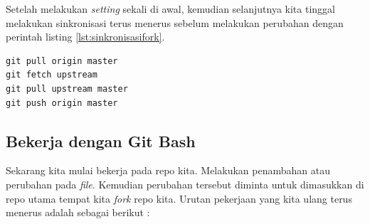 Setelah melakukan \textit{setting} sekali di awal, kemudian selanjutnya kita tinggal melakukan sinkronisasi terus menerus sebelum melakukan perubahan dengan perintah listing \ref{lst:sinkronisasifork}.

\begin{lstlisting}[caption=Perintah Sinkronisasi dengan repo asal,label={lst:sinkronisasifork}]
git pull origin master
git fetch upstream
git pull upstream master
git push origin master
\end{lstlisting}


\subsection{Bekerja dengan Git Bash}
Sekarang kita mulai bekerja pada repo kita. Melakukan penambahan atau perubahan pada \textit{file}. Kemudian perubahan tersebut diminta untuk dimasukkan di repo utama tempat kita \textit{fork} repo kita. Urutan pekerjaan yang kita ulang terus menerus adalah sebagai berikut :
